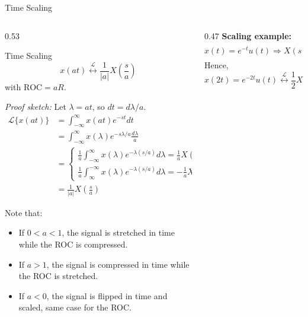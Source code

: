 \begin{frame}[t]{Time Scaling}
  \small
  \vspace{-0.4cm}
  \begin{columns}[T]
    \begin{column}{0.53\textwidth}
      \footnotesize
      \begin{conceptbox}{Time Scaling}
        \[
          x(at) \stackrel{\mathcal{L}}{\longleftrightarrow} \frac{1}{|a|}X\!\left(\frac{s}{a}\right)
        \]
        with $\text{ROC} = aR$.
      \end{conceptbox}
      \vspace{0.2cm}
      \textit{Proof sketch:} Let $\lambda = at$, so $dt = d\lambda / a$.
      \begin{align*}
        \mathcal{L}\{x(at)\}
        & = \int_{-\infty}^{\infty} x(at) e^{-st} dt \\
        &= \int_{-\infty}^{\infty} x(\lambda) e^{-s\lambda/a} \frac{d\lambda}{a} \\
        & =
        \begin{cases}
          \frac{1}{a}\int_{-\infty}^{\infty} x(\lambda) e^{-\lambda(s/a)} d\lambda = \frac{1}{a} X\!\left(\frac{s}{a}\right), & a>0 \\
          \frac{1}{a}\int_{\infty}^{-\infty} x(\lambda) e^{-\lambda(s/a)} d\lambda = -\frac{1}{a} X\!\left(\frac{s}{a}\right), & a<0
        \end{cases} \\
        & = \frac{1}{|a|} X\!\left(\frac{s}{a}\right)
      \end{align*}

      Note that:
      \begin{itemize}
          \scriptsize
        \item If $0<a<1$, the signal is stretched in time while the ROC is compressed.
        \item If $a>1$, the signal is compressed in time while the ROC is stretched.
        \item If $a<0$, the signal is flipped in time and scaled, same case for the ROC.
      \end{itemize}
    \end{column}
    \begin{column}{0.47\textwidth}
      \vspace{0.5cm}
      \textbf{Scaling example:}
      \[
        x(t)=e^{-t}u(t) \Longrightarrow X(s)=\frac{1}{s+1}
      \]
      Hence,
      \[
        x(2t)=e^{-2t}u(t)
        \stackrel{\mathcal{L}}{\longleftrightarrow}
        \frac{1}{2}X\!\left(\frac{s}{2}\right)
        = \frac{1}{s+2}
      \]


\end{column}
\end{columns}
\end{frame}
